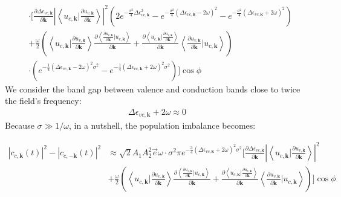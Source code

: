 \begin{equation}
\begin{aligned}
    &\cdot[\frac{\partial  \Delta \epsilon_{vc,\mathbf k}}{\partial \mathbf k} |\left \langle u_{c,\mathbf k}\Big |\frac{\partial u_{v,\mathbf k}}{\partial \mathbf k} \right \rangle|^2 (2e^{-\frac{\sigma^2}{4} \Delta \epsilon_{vc,\mathbf k} ^2}-e^{-\frac{\sigma^2}{4} (\Delta \epsilon_{vc,\mathbf k}-2\omega )^2}-e^{-\frac{\sigma^2}{4} (\Delta \epsilon_{vc,\mathbf k}+2\omega )^2})\\
    &+\frac{\omega }{2} (\left \langle u_{c,\mathbf k} \big | \frac{\partial u_{v,\mathbf k}}{\partial \mathbf k}  \right \rangle \frac{\partial{\left \langle\frac{\partial u_{v,\mathbf k}}{\partial \mathbf k}\Big |u_{c,\mathbf k}\right \rangle}}{\partial {\mathbf k}} +
   \frac{\partial{\left \langle u_{c,\mathbf k}\Big |\frac{\partial u_{v,\mathbf k}}{\partial \mathbf k} \right \rangle}}{\partial {\mathbf k}}
    \left \langle \frac{\partial u_{v,\mathbf k}}{\partial \mathbf k} |  u_{c,\mathbf k} \right \rangle)\\
    &\cdot(e^{-\frac{1}{4}(\Delta \epsilon_{vc,\mathbf k} - 2\omega )^2 \sigma^2}
    -e^{-\frac{1}{4}(\Delta \epsilon_{vc,\mathbf k} + 2\omega )^2 \sigma^2})]\cos\phi
    \end{aligned}
\end{equation}
We consider the band gap between valence and conduction bands close to twice the field's frequency:
\begin{align}
\Delta \epsilon_{vc,\mathbf k}+2\omega \approx0    
\end{align}
Because $\sigma\gg 1/\omega$, in a nutshell, the population imbalance becomes:

\begin{equation}
    \begin{aligned}
 |c_{c,\mathbf k}(t)|^2-|c_{c,-\mathbf k}(t)|^2&\approx\sqrt{2} A_1 A_2^2 \vec e \omega  \cdot \sigma^2 \pi e^{-\frac{3}{4}(\Delta \epsilon_{vc,\mathbf k} + 2\omega )^2 \sigma^2}[\frac{\partial  \Delta \epsilon_{vc,\mathbf k}}{\partial \mathbf k} |\left \langle u_{c,\mathbf k}\Big |\frac{\partial u_{v,\mathbf k}}{\partial \mathbf k} \right \rangle|^2 \\
    &+\frac{\omega }{2} (\left \langle u_{c,\mathbf k} \big | \frac{\partial u_{v,\mathbf k}}{\partial \mathbf k}  \right \rangle \frac{\partial{\left \langle\frac{\partial u_{v,\mathbf k}}{\partial \mathbf k}\Big |u_{c,\mathbf k}\right \rangle}}{\partial {\mathbf k}} +
   \frac{\partial{\left \langle u_{c,\mathbf k}\Big |\frac{\partial u_{v,\mathbf k}}{\partial \mathbf k} \right \rangle}}{\partial {\mathbf k}}
    \left \langle \frac{\partial u_{v,\mathbf k}}{\partial \mathbf k} |  u_{c,\mathbf k} \right \rangle)]\cos\phi
    \end{aligned}
\label{perturbationresult}
\end{equation}

